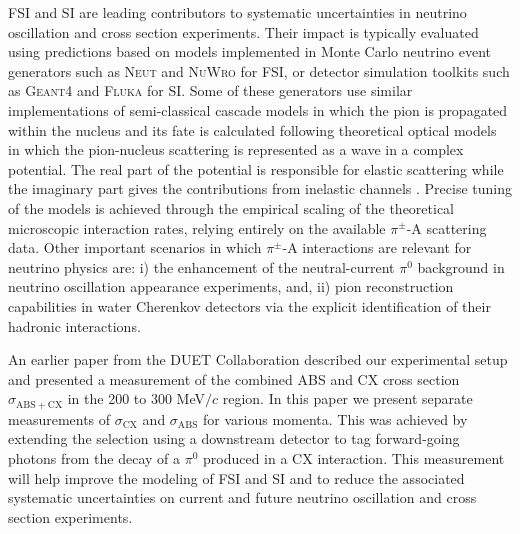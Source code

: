FSI and SI are leading contributors to systematic uncertainties in neutrino oscillation and cross section experiments. Their impact {\color{red} is typically} evaluated using predictions based on models implemented in Monte Carlo {\color{red} neutrino} event generators such as \textsc{Neut} \cite{NEUT} and \textsc{NuWro} \cite{NuWro} {\color{red}for FSI,} {\color{red} or detector simulation toolkits such as \textsc{Geant4} \cite{bertini} and \textsc{Fluka} \cite{fluka1,fluka2} for SI. Some of these} generators use similar implementations of semi-classical cascade models in which the pion is {\color{red}propagated} within the nucleus and its fate is calculated following theoretical optical models in which the pion-nucleus scattering is represented as a wave in a complex potential. The real part of the potential is responsible for elastic scattering while the imaginary part gives the contributions from inelastic channels \cite{Oset,Salcedo}. Precise tuning of the models is achieved through the empirical scaling of the theoretical microscopic interaction rates, relying entirely on the available $\pi^{\pm}$-A scattering data. Other important scenarios in which $\pi^{\pm}$-A interactions are relevant for neutrino physics are: i) the enhancement of the neutral-current $\pi^{0}$ background in neutrino oscillation appearance experiments, and, ii) pion reconstruction capabilities in water Cherenkov detectors via the explicit identification of their hadronic interactions.

An earlier paper from the DUET Collaboration \cite{duet} described our experimental setup and presented a measurement of the combined ABS and CX cross section $\sigma_{\mathrm{ABS}+\mathrm{CX}}$ in the 200 to 300 MeV$/c$ region. In this paper we present separate measurements of $\sigma_{\mathrm{CX}}$ and $\sigma_{\mathrm{ABS}}$ for various momenta. This was achieved by extending the selection using a downstream detector to tag forward-going photons from the decay of a $\pi^0$ produced in a CX interaction. This measurement will help improve the modeling of FSI and SI and to reduce the associated systematic uncertainties on current and future neutrino oscillation and cross section experiments.